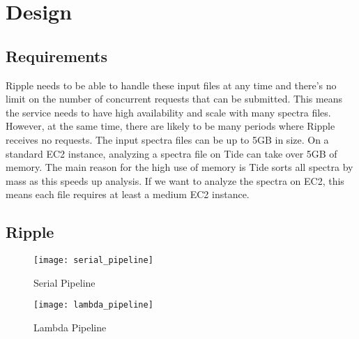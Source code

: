 \section{Design}
\subsection{Requirements}
Ripple needs to be able to handle these input files at any time and there's no limit on the number of concurrent requests that can be submitted.
This means the service needs to have high availability and scale with many spectra files.
However, at the same time, there are likely to be many periods where Ripple receives no requests.
The input spectra files can be up to 5GB in size.
On a standard EC2 instance, analyzing a spectra file on Tide can take over 5GB of memory.
The main reason for the high use of memory is Tide sorts all spectra by mass as this speeds up analysis.
If we want to analyze the spectra on EC2, this means each file requires at least a medium EC2 instance.

\subsection{Ripple}
\begin{figure}
  \centering
  \texttt{[image: serial\_pipeline]}
  \caption{Serial Pipeline}
  \label{fig:serial_pipeline}
\end{figure}
\begin{figure}
  \centering
  \texttt{[image: lambda\_pipeline]}
  \caption{Lambda Pipeline}
  \label{fig:lambda_pipeline}
\end{figure}

